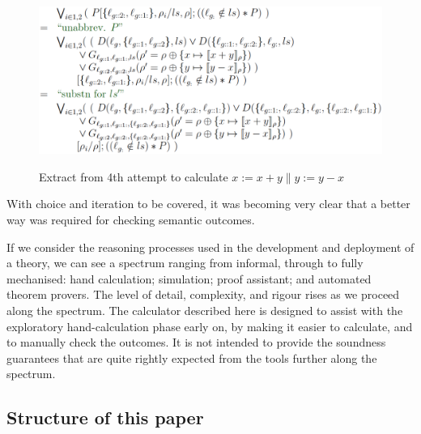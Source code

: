 \begin{figure}
  \centering
  \includegraphics[width=4.5in]{Attempt4.eps}\\
  \caption{Extract from 4th attempt to calculate $x:=x+y \parallel y:=y-x$}
  \label{fig:attempt4}
\end{figure}

With choice and iteration to be covered,
it was becoming very clear that a better way was required
for checking semantic outcomes.

If we consider the reasoning processes used in the development
and deployment of a theory, we can see a spectrum ranging from informal,
through to fully mechanised: hand calculation; simulation; proof assistant;
and automated theorem provers.
The level of detail, complexity, and rigour rises as we proceed along the spectrum.
The calculator described here is designed
to assist with the exploratory hand-calculation phase early on,
by making it easier to calculate, and to manually check the outcomes.
It is not intended to provide the soundness guarantees that are quite rightly
expected from the tools further along the spectrum.


\subsection{Structure of this paper}
